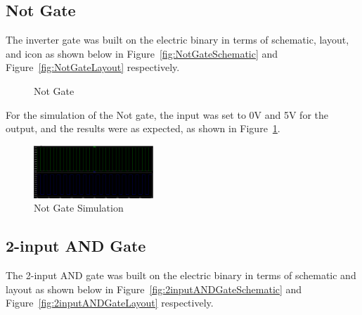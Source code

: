 \documentclass[conference]{IEEEtran}
\begin{document}
\subsection{Not Gate}
The inverter gate was built on the electric binary in terms of schematic, layout, and icon as shown below in Figure~\ref{fig:NotGateSchematic} and Figure~\ref{fig:NotGateLayout} respectively.
\begin{figure}[h]
    \centering
    \hfill
    \caption{Not Gate}
\end{figure}
For the simulation of the Not gate, the input was set to 0V and 5V for the output, and the results were as expected, as shown in Figure~\ref{fig:NotGateSimulation}.
\begin{figure}[h]
    \centering
    \includegraphics[width=0.4\textwidth]{assets/NotGateSimulation.png}
    \caption{Not Gate Simulation}
    \label{fig:NotGateSimulation}
\end{figure}

\subsection{2-input AND Gate}
The 2-input AND gate was built on the electric binary in terms of schematic and layout as shown below in Figure~\ref{fig:2inputANDGateSchematic} and Figure~\ref{fig:2inputANDGateLayout} respectively.
\end{document}

